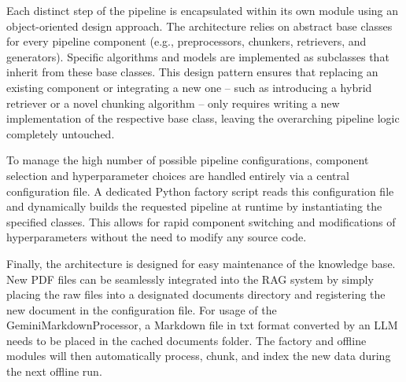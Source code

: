 \documentclass[12pt]{article} %
\begin{document}
Each distinct step of the pipeline is encapsulated within its own module using an object-oriented design approach. The architecture relies on abstract base classes for every pipeline component (e.g., preprocessors, chunkers, retrievers, and generators). Specific algorithms and models are implemented as subclasses that inherit from these base classes. This design pattern ensures that replacing an existing component or integrating a new one -- such as introducing a hybrid retriever or a novel chunking algorithm -- only requires writing a new implementation of the respective base class, leaving the overarching pipeline logic completely untouched.

To manage the high number of possible pipeline configurations, component selection and hyperparameter choices are handled entirely via a central configuration file. A dedicated Python factory script reads this configuration file and dynamically builds the requested pipeline at runtime by instantiating the specified classes. This allows for rapid component switching and modifications of hyperparameters without the need to modify any source code.

Finally, the architecture is designed for easy maintenance of the knowledge base. New PDF files can be seamlessly integrated into the RAG system by simply placing the raw files into a designated documents directory and registering the new document in the configuration file. For usage of the GeminiMarkdownProcessor, a Markdown file in txt format converted by an LLM needs to be placed in the cached documents folder. The factory and offline modules will then automatically process, chunk, and index the new data during the next offline run.
\end{document}

